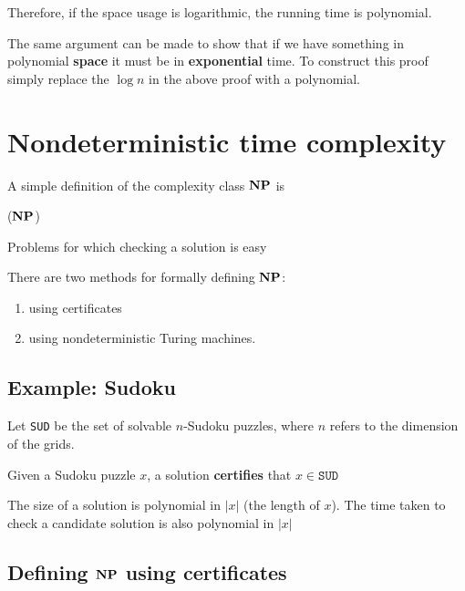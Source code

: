 \documentclass{article}
\begin{document}
  Therefore, if the space usage is logarithmic, the running time is polynomial.

  The same argument can be made to show that if we have something in polynomial \textbf{space} it must be in \textbf{exponential } time. To construct this proof simply replace the $\log n$ in the above proof with a polynomial.


  \section{Nondeterministic time complexity}

  A simple definition of the complexity class $\bf{NP}$ is

  \begin{definition}($\bf{NP}$)

    Problems for which checking a solution is easy

  \end{definition}

  There are two methods for formally defining $\bf{NP}$:
  \begin{enumerate}
    \item using certificates
    \item using nondeterministic Turing machines.
  \end{enumerate}

  \subsection{Example: Sudoku}

  Let \texttt{SUD} be the set of solvable $n$-Sudoku puzzles, where $n$ refers to the dimension of the grids.

  Given a Sudoku puzzle $x$, a solution \textbf{certifies} that $x \in \texttt{SUD} $

  The size of a solution is polynomial in $|x|$ (the length of $x$). The time taken to check a candidate solution is also polynomial in $|x|$

  \subsection{Defining $\bf{NP}$ using certificates}
\end{document}
